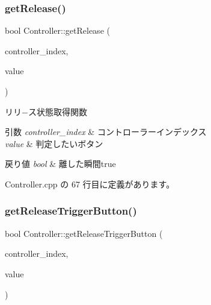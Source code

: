 \mbox{\label{class_controller_ae2fe11eda9a29429cda53f32eb8c1f1d}} 
\subsubsection{\texorpdfstring{get\+Release()}{getRelease()}}
{\footnotesize\ttfamily bool Controller\+::get\+Release (\begin{DoxyParamCaption}\item[{int}]{controller\+\_\+index,  }\item[{int}]{value }\end{DoxyParamCaption})}



リリ−ス状態取得関数 


\begin{DoxyParams}{引数}
{\em controller\+\_\+index} & コントローラーインデックス \\
\hline
{\em value} & 判定したいボタン \\
\hline
\end{DoxyParams}

\begin{DoxyRetVals}{戻り値}
{\em bool} & 離した瞬間true \\
\hline
\end{DoxyRetVals}


 Controller.\+cpp の 67 行目に定義があります。

\mbox{\label{class_controller_a329f08fd8b8293494a1d365148cb195e}} 
\subsubsection{\texorpdfstring{get\+Release\+Trigger\+Button()}{getReleaseTriggerButton()}}
{\footnotesize\ttfamily bool Controller\+::get\+Release\+Trigger\+Button (\begin{DoxyParamCaption}\item[{int}]{controller\+\_\+index,  }\item[{\mbox{\hyperlink{class_controller_abd7dd769d06d277d3aae9afcf135a4ee}{Controller\+::\+Trigger\+Button}}}]{value }\end{DoxyParamCaption})}



